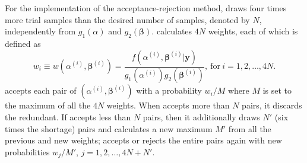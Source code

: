 \documentclass[article]{jss}
\begin{document}
For the  implementation of the acceptance-rejection method,  draws four times more trial samples than the desired number of samples, denoted by $N$, independently from $g_1(\alpha)$ and $g_2(\boldsymbol{\beta})$.  calculates $4N$ weights, each of which is defined as
\begin{equation}\label{weight}
w_i\equiv w(\alpha^{(i)}, \boldsymbol{\beta}^{(i)})=\frac{f(\alpha^{(i)}, \boldsymbol{\beta}^{(i)}\vert \boldsymbol{y})}{g_1(\alpha^{(i)})g_2( \boldsymbol{\beta}^{(i)})}, ~\textrm{for}~ i=1, 2, \ldots, 4N.
\end{equation}
 accepts each pair of $(\alpha^{(i)}, \boldsymbol{\beta}^{(i)})$ with a probability $w_i/M$ where $M$ is set to the maximum of all the $4N$ weights. When  accepts more than  $N$ pairs, it discards the redundant. If  accepts less than $N$ pairs, then it additionally draws   $N'$ (six times the shortage) pairs    and calculates a new maximum $M'$ from all the previous and new weights;  accepts or rejects the entire pairs again with new probabilities $w_j/M'$, $j=1, 2, \ldots, 4N+N'$.



\end{document}
